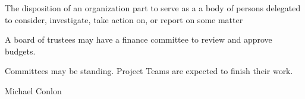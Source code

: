 \documentclass[letterpaper,10pt,english]{sphinxmanual}
\begin{document}
\begin{sphinxShadowBox}

\sphinxAtStartPar
{\hyperref[\detokenize{doc-BFO_0000016::doc}]{}}
\end{sphinxShadowBox}

\begin{sphinxShadowBox}

\sphinxAtStartPar
The disposition of an organization part to serve as a a body of persons delegated to consider, investigate, take action on, or report on some matter
\end{sphinxShadowBox}

\begin{sphinxShadowBox}

\sphinxAtStartPar
{}
\end{sphinxShadowBox}

\begin{sphinxShadowBox}

\sphinxAtStartPar
A board of trustees may have a finance committee to review and approve budgets.
\end{sphinxShadowBox}

\begin{sphinxShadowBox}

\sphinxAtStartPar
Committees may be standing.  Project Teams are expected to finish their work.
\end{sphinxShadowBox}

\begin{sphinxShadowBox}

\sphinxAtStartPar
{}
\end{sphinxShadowBox}

\begin{sphinxShadowBox}

\sphinxAtStartPar
Michael Conlon 
\end{sphinxShadowBox}
\begin{quote}

\ignorespaces \end{quote}
\end{document}

